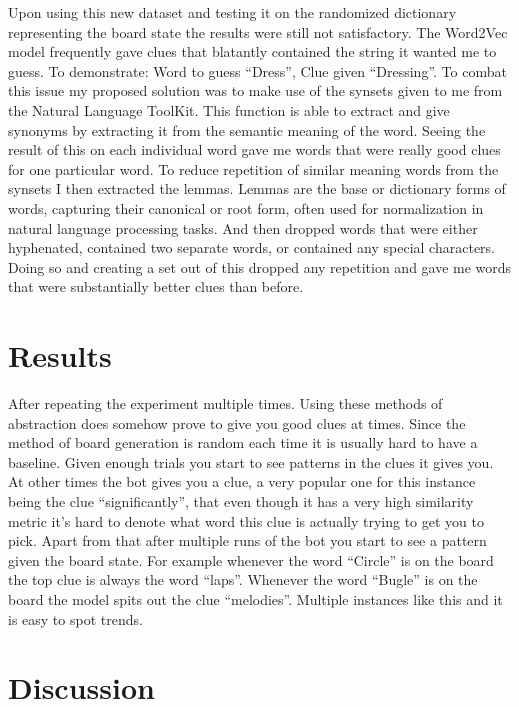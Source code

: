 \documentclass[11pt,a4paper]{article}
\begin{document}
Upon using this new dataset and testing it on the randomized dictionary representing the board state the results were still not satisfactory. The Word2Vec model frequently gave clues that blatantly contained the string it wanted me to guess. To demonstrate: Word to guess “Dress”, Clue given “Dressing”. To combat this issue my proposed solution was to make use of the synsets given to me from the Natural Language ToolKit. This function is able to extract and give synonyms by extracting it from the semantic meaning of the word. Seeing the result of this on each individual word gave me words that were really good clues for one particular word. To reduce repetition of similar meaning words from the synsets I then extracted the lemmas. Lemmas are the base or dictionary forms of words, capturing their canonical or root form, often used for normalization in natural language processing tasks. And then dropped words that were either hyphenated, contained two separate words, or contained any special characters. Doing so and creating a set out of this dropped any repetition and gave me words that were substantially better clues than before. 



\section{Results}

After repeating the experiment multiple times. Using these methods of abstraction does somehow prove to give you good clues at times. Since the method of board generation is random each time it is usually hard to have a baseline. Given enough trials you start to see patterns in the clues it gives you. At other times the bot gives you a clue, a very popular one for this instance being the clue “significantly”, that even though it has a very high similarity metric it's hard to denote what word this clue is actually trying to get you to pick. 
Apart from that after multiple runs of the bot you start to see a pattern given the board state. For example whenever the word “Circle” is on the board the top clue is always the word “laps”. Whenever the word “Bugle” is on the board the model spits out the clue “melodies”. Multiple instances like this and it is easy to spot trends. 

\section{Discussion}
\end{document}
